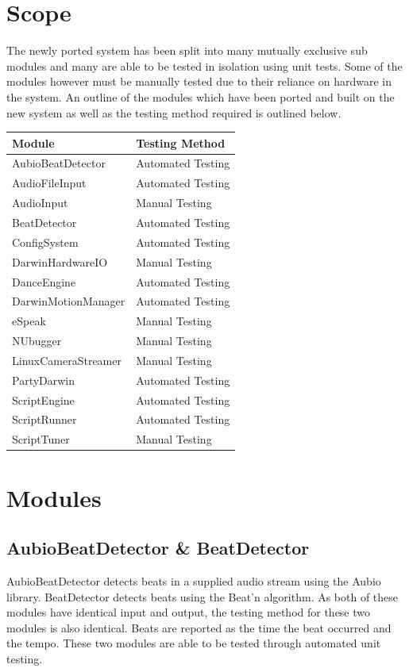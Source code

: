 \documentclass[english,12pt]{scrartcl}
\begin{document}
\section{Scope}
	The newly ported system has been split into many mutually exclusive sub modules and many are able to be tested in isolation using unit tests.
	Some of the modules however	must be manually tested due to their reliance on hardware in the system.
	An outline of the modules which have been ported and built on the new system as well as the testing method required is outlined below. \\
	\begin{tabular}{|p{7cm}|p{7cm}|}
		\hline \textbf{\large Module} & \textbf{\large Testing Method} \\ \hline
		AubioBeatDetector     & Automated Testing  \\ \hline
		AudioFileInput        & Automated Testing  \\ \hline
		AudioInput            & Manual Testing     \\ \hline
		BeatDetector          & Automated Testing  \\ \hline
		ConfigSystem          & Automated Testing  \\ \hline
		DarwinHardwareIO      & Manual Testing     \\ \hline
		DanceEngine           & Automated Testing  \\ \hline
		DarwinMotionManager   & Automated Testing  \\ \hline
		eSpeak                & Manual Testing     \\ \hline
		NUbugger              & Manual Testing     \\ \hline
		LinuxCameraStreamer   & Manual Testing     \\ \hline
		PartyDarwin           & Automated Testing  \\ \hline
		ScriptEngine          & Automated Testing  \\ \hline
		ScriptRunner          & Automated Testing  \\ \hline
		ScriptTuner           & Manual Testing     \\ \hline
	\end{tabular}
	
\section{Modules}
	\subsection{AubioBeatDetector \& BeatDetector}
		AubioBeatDetector detects beats in a supplied audio stream using the Aubio library.
		BeatDetector detects beats using the Beat'n algorithm.
		As both of these modules have identical input and output, the testing method for these two modules is also identical.
		Beats are reported as the time the beat occurred and the tempo.
		These two modules are able to be tested through automated unit testing.
		
\end{document}
